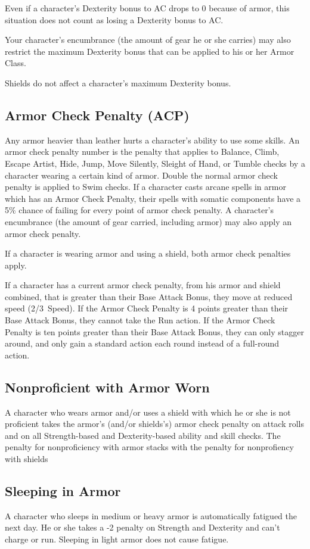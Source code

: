 Even if a character's Dexterity bonus to AC drops to 0 because of armor, this situation does not count as losing a Dexterity bonus to AC.

Your character's encumbrance (the amount of gear he or she carries) may also restrict the maximum Dexterity bonus that can be applied to his or her Armor Class.

Shields do not affect a character's maximum Dexterity bonus.

\subsection{Armor Check Penalty (ACP)}
Any armor heavier than leather hurts a character's ability to use some skills. An armor check penalty number is the penalty that applies to Balance, Climb, Escape Artist, Hide, Jump, Move Silently, Sleight of Hand, or Tumble checks by a character wearing a certain kind of armor. Double the normal armor check penalty is applied to Swim checks. If a character casts arcane spells in armor which has an Armor Check Penalty, their spells with somatic components have a 5\% chance of failing for every point of armor check penalty. A character's encumbrance (the amount of gear carried, including armor) may also apply an armor check penalty.

If a character is wearing armor and using a shield, both armor check penalties apply.

If a character has a current armor check penalty, from his armor and shield combined, that is greater than their Base Attack Bonus, they move at reduced speed (2/3~Speed). If the Armor Check Penalty is 4 points greater than their Base Attack Bonus, they cannot take the Run action. If the Armor Check Penalty is ten points greater than their Base Attack Bonus, they can only stagger around, and only gain a standard action each round instead of a full-round action.

\subsection{Nonproficient with Armor Worn}
A character who wears armor and/or uses a shield with which he or she is not proficient takes the armor’s (and/or shields’s) armor check penalty on attack rolls and on all Strength-based and Dexterity-based ability and skill checks. The penalty for nonproficiency with armor stacks with the penalty for nonprofiency with shields

\subsection{Sleeping in Armor}
A character who sleeps in medium or heavy armor is automatically fatigued the next day. He or she takes a -2 penalty on Strength and Dexterity and can't charge or run. Sleeping in light armor does not cause fatigue.

